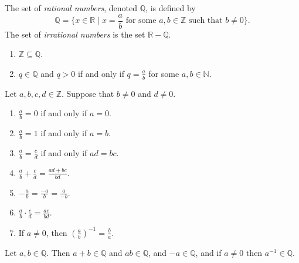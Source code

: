 \begin{definition} %
	\label{nir:d:rat_irrat}

	The set of \emph{rational numbers}, denoted $\mathbb{Q}$, is defined by
	$$
		\mathbb{Q} = \{ x \in \mathbb{R} \mid x = \frac{a}{b} \text{ for some } a, b \in \mathbb{Z} \text{ such that } b \neq 0 \}.
	$$
	The set of \emph{irrational numbers} is the set $\mathbb{R} - \mathbb{Q}$.
\end{definition}

\begin{lemma} %
	\label{nir:l:int_rat_rel}

	\hfill

	\begin{enumerate}
		\item \label{nir:l:int_rat_rel:1}
		      $\mathbb{Z} \subseteq \mathbb{Q}$.
		\item \label{nir:l:int_rat_rel:2}
		      $q \in \mathbb{Q}$ and $q > 0$ if and only if $q = \frac{a}{b}$ for some $a, b \in \mathbb{N}$.
	\end{enumerate}
\end{lemma}

\begin{lemma} %
	\label{nir:l:frac}
	Let $a, b, c, d \in \mathbb{Z}$. Suppose that $b \neq 0$ and $d \neq 0$.

	\begin{enumerate}
		\item \label{nir:l:frac:1}
		      $\frac{a}{b} = 0$ if and only if $a = 0$.
		\item \label{nir:l:frac:2}
		      $\frac{a}{b} = 1$ if and only if $a = b$.
		\item \label{nir:l:frac:3}
		      $\frac{a}{b} = \frac{c}{d}$ if and only if $a d = b c$.
		\item \label{nir:l:frac:4}
		      $\frac{a}{b} + \frac{c}{d} = \frac{a d + b c}{b d}$.
		\item \label{nir:l:frac:5}
		      $-\frac{a}{b} = \frac{-a}{b} = \frac{a}{-b}$.
		\item \label{nir:l:frac:6}
		      $\frac{a}{b} \cdot \frac{c}{d} = \frac{a c}{b d}$.
		\item \label{nir:l:frac:7}
		      If $a \neq 0$, then $\left(\frac{a}{b}\right)^{-1} = \frac{b}{a}$.
	\end{enumerate}
\end{lemma}

\begin{corollary} %
	\label{nir:c:rat}
	Let $a, b \in \mathbb{Q}$. Then $a + b \in \mathbb{Q}$ and $a b \in \mathbb{Q}$, and $-a \in \mathbb{Q}$, and if $a \neq 0$ then $a^{-1} \in \mathbb{Q}$.
\end{corollary}


